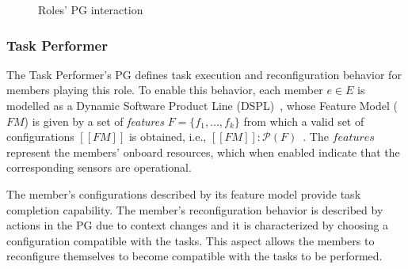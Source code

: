 \begin{figure}[!ht]
    \centering
    \scalebox{.75}{}
    \caption{Roles' PG interaction}
    \label{fig:diagram}
\end{figure}



\subsubsection{Task Performer}

The Task Performer's PG defines task execution and reconfiguration behavior for members playing this role. To enable this behavior, each member $e \in E$ is modelled as a Dynamic Software Product Line (DSPL)~\citep{Hallsteinsen2008}, whose Feature Model ($FM$) is given by a set of \textit{features} $F=\{f_1, ...,f_k\}$ from which a valid set of configurations $[\![FM]\!]$ is obtained, i.e., $[\![FM]\!]: \mathcal{P}(F)$~\citep{Schobbens2006FeatureDA, Kang1990}. The $features$ represent the members’ onboard  resources, which when enabled indicate that the corresponding sensors are operational.

The member's configurations described by its feature model provide task completion capability. The member's reconfiguration behavior is described by actions in the PG due to context changes and it is characterized by choosing a configuration compatible with the tasks. This aspect allows the members to reconfigure themselves to become compatible with the tasks to be performed. 

